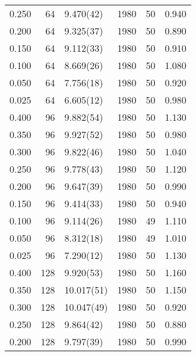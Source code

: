 \begin{tabular}{rrlrrr}
 0.250 &      64 & 9.470(42)  &                 1980 &                   50 &    0.940 \\
 0.200 &      64 & 9.325(37)  &                 1980 &                   50 &    0.890 \\
 0.150 &      64 & 9.112(33)  &                 1980 &                   50 &    0.910 \\
 0.100 &      64 & 8.669(26)  &                 1980 &                   50 &    1.080 \\
 0.050 &      64 & 7.756(18)  &                 1980 &                   50 &    0.920 \\
 0.025 &      64 & 6.605(12)  &                 1980 &                   50 &    0.980 \\
 0.400 &      96 & 9.882(54)  &                 1980 &                   50 &    1.130 \\
 0.350 &      96 & 9.927(52)  &                 1980 &                   50 &    0.980 \\
 0.300 &      96 & 9.822(46)  &                 1980 &                   50 &    1.040 \\
 0.250 &      96 & 9.778(43)  &                 1980 &                   50 &    1.120 \\
 0.200 &      96 & 9.647(39)  &                 1980 &                   50 &    0.990 \\
 0.150 &      96 & 9.414(33)  &                 1980 &                   50 &    0.940 \\
 0.100 &      96 & 9.114(26)  &                 1980 &                   49 &    1.110 \\
 0.050 &      96 & 8.312(18)  &                 1980 &                   49 &    1.010 \\
 0.025 &      96 & 7.290(12)  &                 1980 &                   50 &    1.130 \\
 0.400 &     128 & 9.920(53)  &                 1980 &                   50 &    1.160 \\
 0.350 &     128 & 10.017(51) &                 1980 &                   50 &    1.150 \\
 0.300 &     128 & 10.047(49) &                 1980 &                   50 &    0.920 \\
 0.250 &     128 & 9.864(42)  &                 1980 &                   50 &    0.880 \\
 0.200 &     128 & 9.797(39)  &                 1980 &                   50 &    0.990 \\

\end{tabular}
